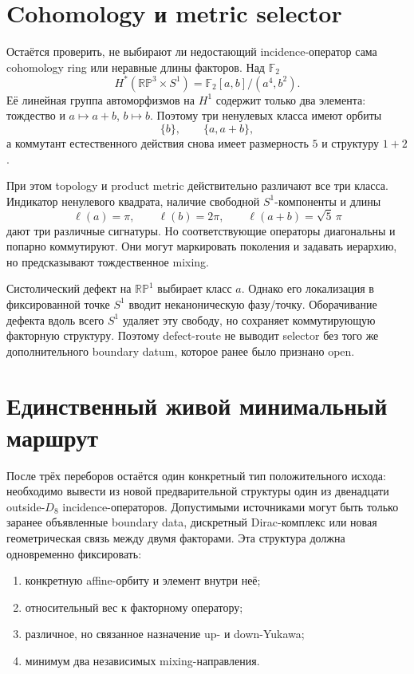 \documentclass[12pt,a4paper]{article}
\begin{document}
\section{Cohomology и metric selector}

Остаётся проверить, не выбирают ли недостающий incidence-оператор сама
cohomology ring или неравные длины факторов. Над $\mathbb F_2$
\begin{equation}
 H^*(\mathbb{RP}^3\times S^1)
 =\mathbb F_2[a,b]/(a^4,b^2).
\end{equation}
Её линейная группа автоморфизмов на $H^1$ содержит только два элемента:
тождество и $a\mapsto a+b$, $b\mapsto b$. Поэтому три ненулевых класса имеют
орбиты
\begin{equation}
 \{b\},\qquad\{a,a+b\},
\end{equation}
а коммутант естественного действия снова имеет размерность $5$ и структуру
$1+2$.

При этом topology и product metric действительно различают все три класса.
Индикатор ненулевого квадрата, наличие свободной $S^1$-компоненты и длины
\begin{equation}
 \ell(a)=\pi,\qquad \ell(b)=2\pi,\qquad
 \ell(a+b)=\sqrt5\,\pi
\end{equation}
дают три различные сигнатуры. Но соответствующие операторы диагональны и
попарно коммутируют. Они могут маркировать поколения и задавать иерархию, но
предсказывают тождественное mixing.

Систолический дефект на $\mathbb{RP}^1$ выбирает класс $a$. Однако его
локализация в фиксированной точке $S^1$ вводит неканоническую фазу/точку.
Оборачивание дефекта вдоль всего $S^1$ удаляет эту свободу, но сохраняет
коммутирующую факторную структуру. Поэтому defect-route не выводит selector без
того же дополнительного boundary datum, которое ранее было признано open.

\section{Единственный живой минимальный маршрут}

После трёх переборов остаётся один конкретный тип положительного исхода:
необходимо вывести из новой предварительной структуры один из двенадцати
outside-$D_8$ incidence-операторов. Допустимыми источниками могут быть только
заранее объявленные boundary data, дискретный Dirac-комплекс или новая
геометрическая связь между двумя факторами. Эта структура должна одновременно
фиксировать:
\begin{enumerate}
 \item конкретную affine-орбиту и элемент внутри неё;
 \item относительный вес к факторному оператору;
 \item различное, но связанное назначение up- и down-Yukawa;
 \item минимум два независимых mixing-направления.
\end{enumerate}
\end{document}
